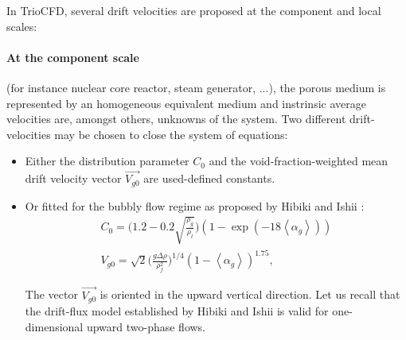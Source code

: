 In TrioCFD, several drift velocities are proposed at the component and local scales: 

\paragraph{At the component scale } (for instance nuclear core reactor, steam generator, ...), the porous medium is represented by an homogeneous equivalent medium and instrinsic average velocities are, amongst others, unknowns of the system. Two different drift-velocities may be chosen to close the system of equations:
\begin{itemize}
	\item Either the distribution parameter $C_0$ and the void-fraction-weighted mean drift velocity vector $\overrightarrow{V_{g0}}$ are used-defined constants. 
	\item Or fitted for the bubbly flow regime as proposed by  Hibiki and Ishii \cite{hibiki2002distribution} : 
	\begin{align}
		C_0 = \big(1.2 - 0.2 \sqrt{\frac{\rho_g}{\rho_l}}\big)(1-\exp(-18\left\langle\alpha_g\right\rangle))\\
		V_{g0} = \sqrt{2}\big(\frac{g\Delta\rho}{\rho_f^2}\big)^{1/4}(1-\left\langle\alpha_g\right\rangle)^{1.75},
	\end{align}

The vector $\overrightarrow{V_{g0}}$ is oriented in the upward vertical direction. Let us recall that the drift-flux model established by Hibiki and Ishii \cite{hibiki2002distribution} is valid for one-dimensional upward two-phase flows. 
\end{itemize}

